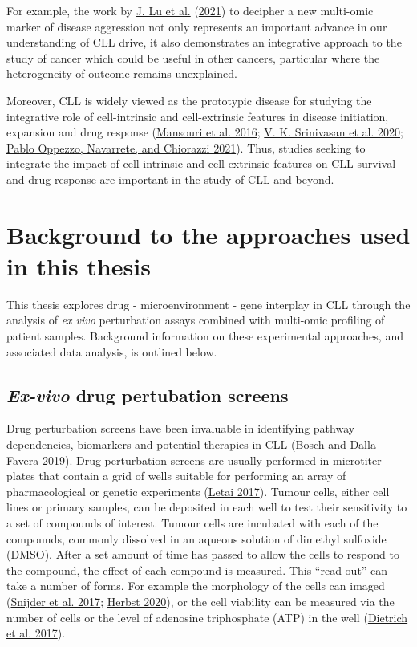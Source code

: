 \documentclass[11pt, a4paper, twosided]{book}
\begin{document}
For example, the work by \protect\hyperlink{ref-Lu2021}{J. Lu et al.} (\protect\hyperlink{ref-Lu2021}{2021}) to decipher a new multi-omic marker of disease aggression not only represents an important advance in our understanding of CLL drive, it also demonstrates an integrative approach to the study of cancer which could be useful in other cancers, particular where the heterogeneity of outcome remains unexplained.

Moreover, CLL is widely viewed as the prototypic disease for studying the integrative role of cell-intrinsic and cell-extrinsic features in disease initiation, expansion and drug response (\protect\hyperlink{ref-Mansouri2016}{Mansouri et al. 2016}; \protect\hyperlink{ref-Srinivasan2020}{V. K. Srinivasan et al. 2020}; \protect\hyperlink{ref-Oppezzo2021}{Pablo Oppezzo, Navarrete, and Chiorazzi 2021}). Thus, studies seeking to integrate the impact of cell-intrinsic and cell-extrinsic features on CLL survival and drug response are important in the study of CLL and beyond.

\hypertarget{background-approaches-intro}{%
\section{Background to the approaches used in this thesis}\label{background-approaches-intro}}

This thesis explores drug - microenvironment - gene interplay in CLL through the analysis of \emph{ex vivo} perturbation assays combined with multi-omic profiling of patient samples. Background information on these experimental approaches, and associated data analysis, is outlined below.

\hypertarget{drug-perturbation-screens-intro}{%
\subsection{\texorpdfstring{\emph{Ex-vivo} drug pertubation screens}{Ex-vivo drug pertubation screens}}\label{drug-perturbation-screens-intro}}

Drug perturbation screens have been invaluable in identifying pathway dependencies, biomarkers and potential therapies in CLL (\protect\hyperlink{ref-Bosch2019}{Bosch and Dalla-Favera 2019}). Drug perturbation screens are usually performed in microtiter plates that contain a grid of wells suitable for performing an array of pharmacological or genetic experiments (\protect\hyperlink{ref-Letai2017}{Letai 2017}). Tumour cells, either cell lines or primary samples, can be deposited in each well to test their sensitivity to a set of compounds of interest. Tumour cells are incubated with each of the compounds, commonly dissolved in an aqueous solution of dimethyl sulfoxide (DMSO). After a set amount of time has passed to allow the cells to respond to the compound, the effect of each compound is measured. This ``read-out'' can take a number of forms. For example the morphology of the cells can imaged (\protect\hyperlink{ref-Snijder2017}{Snijder et al. 2017}; \protect\hyperlink{ref-HerbstThesis}{Herbst 2020}), or the cell viability can be measured via the number of cells or the level of adenosine triphosphate (ATP) in the well (\protect\hyperlink{ref-JCIpaper}{Dietrich et al. 2017}).
\end{document}
